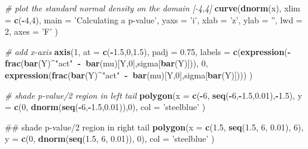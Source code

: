 \documentclass[]{book}
\newenvironment{Shaded}{\begin{snugshade}}{\end{snugshade}}
\newcommand{\KeywordTok}[1]{\textcolor[rgb]{0.13,0.29,0.53}{\textbf{#1}}}
\newcommand{\DataTypeTok}[1]{\textcolor[rgb]{0.13,0.29,0.53}{#1}}
\newcommand{\DecValTok}[1]{\textcolor[rgb]{0.00,0.00,0.81}{#1}}
\newcommand{\FloatTok}[1]{\textcolor[rgb]{0.00,0.00,0.81}{#1}}
\newcommand{\StringTok}[1]{\textcolor[rgb]{0.31,0.60,0.02}{#1}}
\newcommand{\CommentTok}[1]{\textcolor[rgb]{0.56,0.35,0.01}{\textit{#1}}}
\newcommand{\OperatorTok}[1]{\textcolor[rgb]{0.81,0.36,0.00}{\textbf{#1}}}
\newcommand{\ErrorTok}[1]{\textcolor[rgb]{0.64,0.00,0.00}{\textbf{#1}}}
\newcommand{\NormalTok}[1]{#1}
\theoremstyle{definition}
\theoremstyle{definition}
\theoremstyle{definition}
\theoremstyle{remark}
\begin{document}
\begin{Shaded}
\begin{Highlighting}[]
\CommentTok{# plot the standard normal density on the domain [-4,4]}
\KeywordTok{curve}\NormalTok{(}\KeywordTok{dnorm}\NormalTok{(x),}
      \DataTypeTok{xlim =} \KeywordTok{c}\NormalTok{(}\OperatorTok{-}\DecValTok{4}\NormalTok{,}\DecValTok{4}\NormalTok{),}
      \DataTypeTok{main =} \StringTok{'Calculating a p-value'}\NormalTok{,}
      \DataTypeTok{yaxs =} \StringTok{'i'}\NormalTok{,}
      \DataTypeTok{xlab =} \StringTok{'z'}\NormalTok{,}
      \DataTypeTok{ylab =} \StringTok{''}\NormalTok{,}
      \DataTypeTok{lwd =} \DecValTok{2}\NormalTok{,}
      \DataTypeTok{axes =} \StringTok{'F'}
\NormalTok{      )}

\CommentTok{# add x-axis}
\KeywordTok{axis}\NormalTok{(}\DecValTok{1}\NormalTok{, }
     \DataTypeTok{at =} \KeywordTok{c}\NormalTok{(}\OperatorTok{-}\FloatTok{1.5}\NormalTok{,}\DecValTok{0}\NormalTok{,}\FloatTok{1.5}\NormalTok{), }
     \DataTypeTok{padj =} \FloatTok{0.75}\NormalTok{,}
     \DataTypeTok{labels =} \KeywordTok{c}\NormalTok{(}\KeywordTok{expression}\NormalTok{(}\OperatorTok{-}\KeywordTok{frac}\NormalTok{(}\KeywordTok{bar}\NormalTok{(Y)}\OperatorTok{^}\StringTok{"act"}\OperatorTok{~-}\ErrorTok{~}\KeywordTok{bar}\NormalTok{(mu)[Y,}\DecValTok{0}\NormalTok{],sigma[}\KeywordTok{bar}\NormalTok{(Y)])),}
                \DecValTok{0}\NormalTok{,}
                \KeywordTok{expression}\NormalTok{(}\KeywordTok{frac}\NormalTok{(}\KeywordTok{bar}\NormalTok{(Y)}\OperatorTok{^}\StringTok{"act"}\OperatorTok{~-}\ErrorTok{~}\KeywordTok{bar}\NormalTok{(mu)[Y,}\DecValTok{0}\NormalTok{],sigma[}\KeywordTok{bar}\NormalTok{(Y)])))}
\NormalTok{     )}

\CommentTok{# shade p-value/2 region in left tail}
\KeywordTok{polygon}\NormalTok{(}\DataTypeTok{x =} \KeywordTok{c}\NormalTok{(}\OperatorTok{-}\DecValTok{6}\NormalTok{, }\KeywordTok{seq}\NormalTok{(}\OperatorTok{-}\DecValTok{6}\NormalTok{,}\OperatorTok{-}\FloatTok{1.5}\NormalTok{,}\FloatTok{0.01}\NormalTok{),}\OperatorTok{-}\FloatTok{1.5}\NormalTok{),}
        \DataTypeTok{y =} \KeywordTok{c}\NormalTok{(}\DecValTok{0}\NormalTok{, }\KeywordTok{dnorm}\NormalTok{(}\KeywordTok{seq}\NormalTok{(}\OperatorTok{-}\DecValTok{6}\NormalTok{,}\OperatorTok{-}\FloatTok{1.5}\NormalTok{,}\FloatTok{0.01}\NormalTok{)),}\DecValTok{0}\NormalTok{), }
        \DataTypeTok{col =} \StringTok{'steelblue'}
\NormalTok{        )}

\NormalTok{## shade p-value/2 region in right tail}
\KeywordTok{polygon}\NormalTok{(}\DataTypeTok{x =} \KeywordTok{c}\NormalTok{(}\FloatTok{1.5}\NormalTok{, }\KeywordTok{seq}\NormalTok{(}\FloatTok{1.5}\NormalTok{, }\DecValTok{6}\NormalTok{, }\FloatTok{0.01}\NormalTok{), }\DecValTok{6}\NormalTok{),}
        \DataTypeTok{y =} \KeywordTok{c}\NormalTok{(}\DecValTok{0}\NormalTok{, }\KeywordTok{dnorm}\NormalTok{(}\KeywordTok{seq}\NormalTok{(}\FloatTok{1.5}\NormalTok{, }\DecValTok{6}\NormalTok{, }\FloatTok{0.01}\NormalTok{)), }\DecValTok{0}\NormalTok{), }
        \DataTypeTok{col =} \StringTok{'steelblue'}
\NormalTok{        )}
\end{Highlighting}
\end{Shaded}
\end{document}
